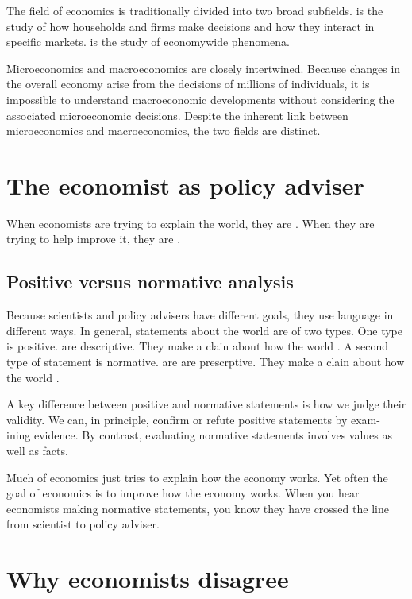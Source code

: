 The field of economics is traditionally divided into two broad subfields.
 is the study of how households and firms make decisions and how they interact in specific markets.
 is the study of economywide phenomena.



Microeconomics and macroeconomics are closely intertwined.
Because changes in the overall economy arise from the decisions of millions of individuals, it is impossible to understand macroeconomic developments without considering the associated microeconomic decisions.
Despite the inherent link between microeconomics and macroeconomics, the two fields are distinct.


\section{The economist as policy adviser}


When economists are trying to explain the world, they are .
When they are trying to help improve it, they are .


\subsection{Positive versus normative analysis}


Because scientists and policy advisers have different goals, they use language in different ways.
In general, statements about the world are of two types.
One type is positive.
 are descriptive.
They make a clain about how the world .
A second type of statement is normative.
 are are prescrptive.
They make a clain about how the world .


A key difference between positive and normative statements is how we judge their validity.
We can, in principle, confirm or refute positive statements by exam- ining evidence.
By contrast, evaluating normative statements involves values as well as facts.


Much of economics just tries to explain how the economy works.
Yet often the goal of economics is to improve how the economy works.
When you hear economists making normative statements, you know they have crossed the line from scientist to policy adviser.



\section{Why economists disagree}

